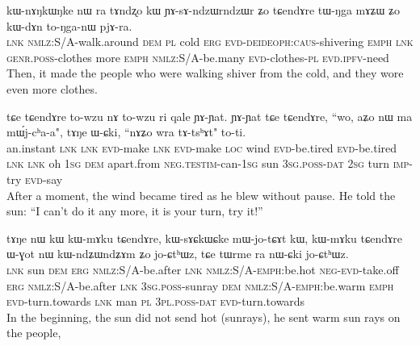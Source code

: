 \documentclass[oldfontcommands,oneside,a4paper,11pt]{article}
\newcommand{\ipab}[1]{{\phon#1}} %
\begin{document}
 

\begin{exe} 
 \ex 
\gll  \ipab{tɕendɤre,} \ipab{kɯ-nɤŋkɯŋke} \ipab{nɯ} \ipab{ra} \ipab{tɤndʐo} \ipab{kɯ} \ipab{ɲɤ-sɤ-ndzɯrndzɯr} \ipab{ʑo} \ipab{tɕendɤre} \ipab{tɯ-ŋga} \ipab{mɤʑɯ} \ipab{ʑo} \ipab{kɯ-dɤn}  \ipab{to-ŋga-nɯ} \ipab{pjɤ-ra.} \\ 
  \textsc{lnk}        \textsc{nmlz}:S/A-walk.around  \textsc{dem} \textsc{pl}  cold     \textsc{erg}  \textsc{evd}-\textsc{deideoph}:\textsc{caus}-shivering      \textsc{emph} \textsc{lnk}       \textsc{genr}.\textsc{poss}-clothes more    \textsc{emph} \textsc{nmlz}:S/A-be.many  \textsc{evd}-clothes-\textsc{pl}  \textsc{evd}.\textsc{ipfv}-need\\ 
 \glt  Then, it made the people who were walking shiver from the cold, and they wore even more clothes.
\end{exe} 

\begin{exe} 
 \ex 
\gll   \ipab{toʁde} \ipab{tɕe} \ipab{tɕendɤre} \ipab{to-wzu} \ipab{nɤ} \ipab{to-wzu} \ipab{ri} \ipab{qale}  \ipab{ɲɤ-ɲat.} \ipab{ɲɤ-ɲat} \ipab{tɕe} \ipab{tɕendɤre,} \ipab{``wo,} \ipab{aʑo} \ipab{nɯ} \ipab{ma} \ipab{mɯ́j-cʰa-a",} \ipab{tɤŋe} \ipab{ɯ-ɕki,} \ipab{``nɤʑo} \ipab{wra} \ipab{tɤ-tsʰɤt"} \ipab{to-ti.} \\
  an.instant \textsc{lnk} \textsc{lnk}       \textsc{evd}-make \textsc{lnk} \textsc{evd}-make \textsc{loc} wind  \textsc{evd}-be.tired \textsc{evd}-be.tired \textsc{lnk} \textsc{lnk}        oh     1\textsc{sg} \textsc{dem} apart.from \textsc{neg}.\textsc{testim}-can-1\textsc{sg} sun  3\textsc{sg}.\textsc{poss}-\textsc{dat} 2\textsc{sg}    turn \textsc{imp}-try     \textsc{evd}-say\\
 \glt  After a moment, the wind became tired as he blew without pause. He told the sun: ``I can't do it any more, it is your turn, try it!''
\end{exe} 

 

\begin{exe} 
 \ex 
\gll   \ipab{tɕe} \ipab{tɤŋe} \ipab{nɯ} \ipab{kɯ} \ipab{kɯ-mɤku} \ipab{tɕendɤre,} \ipab{kɯ-sɤɕkɯɕke} \ipab{mɯ-jo-tɕɤt} \ipab{kɯ,} \ipab{kɯ-mɤku} \ipab{tɕendɤre} \ipab{ɯ-ɣot} \ipab{nɯ} \ipab{kɯ-ndʑɯndʑɤm} \ipab{ʑo} \ipab{jo-ɕtʰɯz,} \ipab{tɕe} \ipab{tɯrme} \ipab{ra} \ipab{nɯ-ɕki} \ipab{jo-ɕtʰɯz.} \\ 
  \textsc{lnk} sun    \textsc{dem} \textsc{erg} \textsc{nmlz}:S/A-be.after  \textsc{lnk}        \textsc{nmlz}:S/A-\textsc{emph}:be.hot \textsc{neg}-\textsc{evd}-take.off \textsc{erg} \textsc{nmlz}:S/A-be.after \textsc{lnk}       3\textsc{sg}.\textsc{poss}-sunray  \textsc{dem} \textsc{nmlz}:S/A-\textsc{emph}:be.warm \textsc{emph} \textsc{evd}-turn.towards \textsc{lnk} man    \textsc{pl}  3\textsc{pl}.\textsc{poss}-\textsc{dat} \textsc{evd}-turn.towards\\ 
 \glt  In the beginning, the sun did not send hot (sunrays), he sent warm sun rays on the people,
\end{exe} 
\end{document}
